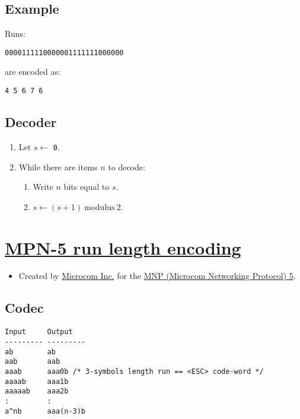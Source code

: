 \subsection{Example}

Runs:

\begin{verbatim}
0000111110000001111111000000
\end{verbatim}

are encoded as:

\begin{verbatim}
4 5 6 7 6
\end{verbatim}

\subsection{Decoder}

\begin{enumerate}
\tightlist
\item Let \(s\leftarrow\) \texttt{0}.
\item While there are items \(n\) to decode:
  \tightlist
  \begin{enumerate}
  \tightlist
  \item Write \(n\) bits equal to \(s\).
  \item \(s\leftarrow (s+1)~\text{modulus}~2\).
  \end{enumerate}
\end{enumerate}

\section{\href{https://en.wikipedia.org/wiki/Microcom_Networking_Protocol\#MNP_5}{MPN-5 run length encoding}}

\begin{itemize}
\tightlist
\item Created by
  \href{https://en.wikipedia.org/wiki/Microcom_Networking_Protocol}{Microcom
  Inc.} for the
  \href{https://scholar.google.es/scholar?hl=es\&as_sdt=0\%2C5\&q=held+data+compression+techniques+applications\&btnG=}{MNP
  (Microcom Networking Protocol) 5}.
\end{itemize}

\subsection{Codec}

\begin{verbatim}
Input     Output
--------- ---------
ab        ab
aab       aab
aaab      aaa0b /* 3-symbols length run == <ESC> code-word */
aaaab     aaa1b
aaaaab    aaa2b
:         :
a^nb      aaa(n-3)b
\end{verbatim}

